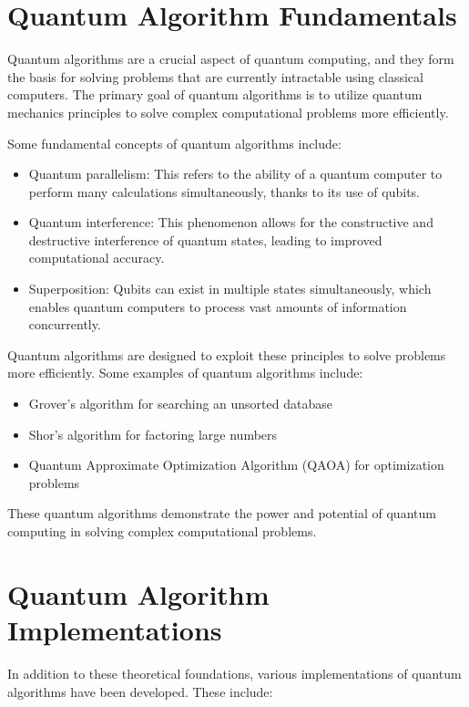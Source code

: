 \documentclass{report}%
\begin{document}
\section{Quantum Algorithm Fundamentals}

Quantum algorithms are a crucial aspect of quantum computing, and they form the basis for solving problems that are currently intractable using classical computers. The primary goal of quantum algorithms is to utilize quantum mechanics principles to solve complex computational problems more efficiently.

Some fundamental concepts of quantum algorithms include:

\begin{itemize}
\begin{itemize}
\item Quantum parallelism: This refers to the ability of a quantum computer to perform many calculations simultaneously, thanks to its use of qubits.
\item Quantum interference: This phenomenon allows for the constructive and destructive interference of quantum states, leading to improved computational accuracy.
\item Superposition: Qubits can exist in multiple states simultaneously, which enables quantum computers to process vast amounts of information concurrently.
\end{itemize}

Quantum algorithms are designed to exploit these principles to solve problems more efficiently. Some examples of quantum algorithms include:

\begin{itemize}
\item Grover's algorithm for searching an unsorted database
\item Shor's algorithm for factoring large numbers
\item Quantum Approximate Optimization Algorithm (QAOA) for optimization problems
\end{itemize}

These quantum algorithms demonstrate the power and potential of quantum computing in solving complex computational problems.

\section{Quantum Algorithm Implementations}

In addition to these theoretical foundations, various implementations of quantum algorithms have been developed. These include:


\end{itemize}
\end{document}
